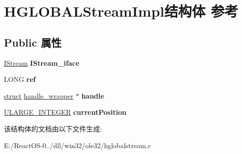 \hypertarget{struct_h_g_l_o_b_a_l_stream_impl}{}\section{H\+G\+L\+O\+B\+A\+L\+Stream\+Impl结构体 参考}
\label{struct_h_g_l_o_b_a_l_stream_impl}
\subsection*{Public 属性}
\begin{DoxyCompactItemize}
\item 
\mbox{\label{struct_h_g_l_o_b_a_l_stream_impl_aedc951811cd130b8697e32b16288df57}} 
\hyperlink{interface_i_stream}{I\+Stream} {\bfseries I\+Stream\+\_\+iface}
\item 
\mbox{\label{struct_h_g_l_o_b_a_l_stream_impl_ad950d8b90d6e144ac1ee49da6cd414ed}} 
L\+O\+NG {\bfseries ref}
\item 
\mbox{\label{struct_h_g_l_o_b_a_l_stream_impl_a6fb009c6f60f0690c374aefec7dea563}} 
\hyperlink{interfacestruct}{struct} \hyperlink{structhandle__wrapper}{handle\+\_\+wrapper} $\ast$ {\bfseries handle}
\item 
\mbox{\label{struct_h_g_l_o_b_a_l_stream_impl_a361d734a5f9f6d363da6a5b2e294b831}} 
\hyperlink{struct___u_l_a_r_g_e___i_n_t_e_g_e_r}{U\+L\+A\+R\+G\+E\+\_\+\+I\+N\+T\+E\+G\+ER} {\bfseries current\+Position}
\end{DoxyCompactItemize}


该结构体的文档由以下文件生成\+:\begin{DoxyCompactItemize}
\item 
E\+:/\+React\+O\+S-\/0../dll/win32/ole32/hglobalstream.\+c\end{DoxyCompactItemize}
